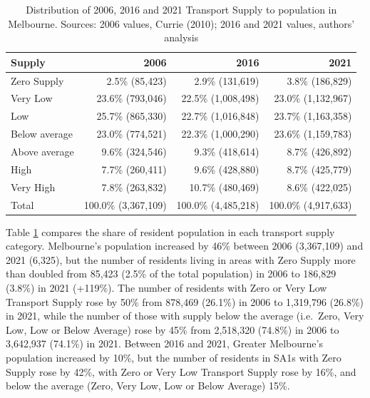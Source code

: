 \documentclass[preprint, 3p,
authoryear]{elsarticle} %
\begin{document}
\begin{table}

\caption{\label{tab:Greater_Melbourne_CCDs_SA1_population}Distribution of 2006, 2016 and 2021 Transport Supply to population in Melbourne. Sources: 2006 values, Currie (2010); 2016 and 2021 values, authors' analysis}
\centering
\begin{tabular}[t]{l|r|r|r}
\hline
Supply & 2006 & 2016 & 2021\\
\hline
Zero Supply & 2.5\%    (85,423) & 2.9\%   (131,619) & 3.8\%   (186,829)\\
\hline
Very Low & 23.6\%   (793,046) & 22.5\% (1,008,498) & 23.0\% (1,132,967)\\
\hline
Low & 25.7\%   (865,330) & 22.7\% (1,016,848) & 23.7\% (1,163,358)\\
\hline
Below average & 23.0\%   (774,521) & 22.3\% (1,000,290) & 23.6\% (1,159,783)\\
\hline
Above average & 9.6\%   (324,546) & 9.3\%   (418,614) & 8.7\%   (426,892)\\
\hline
High & 7.7\%   (260,411) & 9.6\%   (428,880) & 8.7\%   (425,779)\\
\hline
Very High & 7.8\%   (263,832) & 10.7\%   (480,469) & 8.6\%   (422,025)\\
\hline
Total & 100.0\% (3,367,109) & 100.0\% (4,485,218) & 100.0\% (4,917,633)\\
\hline
\end{tabular}
\end{table}

Table \ref{tab:Greater_Melbourne_CCDs_SA1_population} compares the share
of resident population in each transport supply category. Melbourne's
population increased by 46\% between 2006 (3,367,109) and 2021 (6,325),
but the number of residents living in areas with Zero Supply more than
doubled from 85,423 (2.5\% of the total population) in 2006 to 186,829
(3.8\%) in 2021 (+119\%). The number of residents with Zero or Very Low
Transport Supply rose by 50\% from 878,469 (26.1\%) in 2006 to 1,319,796
(26.8\%) in 2021, while the number of those with supply below the
average (i.e.~Zero, Very Low, Low or Below Average) rose by 45\% from
2,518,320 (74.8\%) in 2006 to 3,642,937 (74.1\%) in 2021. Between 2016
and 2021, Greater Melbourne's population increased by 10\%, but the
number of residents in SA1s with Zero Supply rose by 42\%, with Zero or
Very Low Transport Supply rose by 16\%, and below the average (Zero,
Very Low, Low or Below Average) 15\%.
\end{document}
